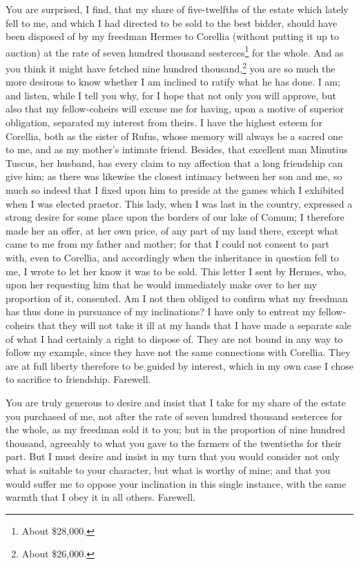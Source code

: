You are surprised, I find, that my share of five-twelfths of the estate
which lately fell to me, and which I had directed to be sold to the best
bidder, should have been disposed of by my freedman Hermes to Corellia
(without putting it up to auction) at the rate of seven hundred thousand
sesterces\footnote{About \$28,000.} for the whole. And as you think it might
have fetched nine hundred thousand,\footnote{About \$26,000.} you are so much the
more desirous to know whether I am inclined to ratify what he has done. I
am; and listen, while I tell you why, for I hope that not only you will
approve, but also that my fellow-coheirs will excuse me for having, upon a
motive of superior obligation, separated my interest from theirs. I have
the highest esteem for Corellia, both as the sister of Rufus, whose memory
will always be a sacred one to me, and as my mother's intimate friend.
Besides, that excellent man Minutius Tuscus, her husband, has every claim
to my affection that a long friendship can give him; as there was likewise
the closest intimacy between her son and me, so much so indeed that I
fixed upon him to preside at the games which I exhibited when I was
elected praetor. This lady, when I was last in the country, expressed a
strong desire for some place upon the borders of our lake of Comum; I
therefore made her an offer, at her own price, of any part of my land
there, except what came to me from my father and mother; for that I could
not consent to part with, even to Corellia, and accordingly when the
inheritance in question fell to me, I wrote to let her know it was to be
sold. This letter I sent by Hermes, who, upon her requesting him that he
would immediately make over to her my proportion of it, consented. Am I
not then obliged to confirm what my freedman has thus done in pursuance of
my inclinations? I have only to entreat my fellow-coheirs that they will
not take it ill at my hands that I have made a separate sale of what I had
certainly a right to dispose of. They are not bound in any way to follow
my example, since they have not the same connections with Corellia. They
are at full liberty therefore to be guided by interest, which in my own
case I chose to sacrifice to friendship. Farewell.


You are truly generous to desire and insist that I take for my share of
the estate you purchased of me, not after the rate of seven hundred
thousand sesterces for the whole, as my freedman sold it to you; but in
the proportion of nine hundred thousand, agreeably to what you gave to the
farmers of the twentieths for their part. But I must desire and insist in
my turn that you would consider not only what is suitable to your
character, but what is worthy of mine; and that you would suffer me to
oppose your inclination in this single instance, with the same warmth that
I obey it in all others. Farewell.

